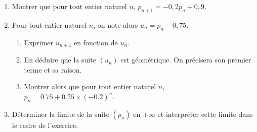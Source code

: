 \documentclass[11pt,fleqn, openany]{book} %
\begin{document}
\begin{exercise}
\begin{center}
\end{center}
  \begin{enumerate}  
    \item Montrer que pour tout entier naturel $n$, $p_{n+1}=-0,2p_n+0,9$.
    \item Pour tout entier naturel $n$, on note alors $u_n=p_n-0,75$.
    \begin{enumerate}
        \item Exprimer $u_{n+1}$ en fonction de $u_n$.
        \item En déduire que la suite $(u_n)$ est géométrique. On précisera son premier terme et sa raison.
        \item Montrer alors que pour tout entier naturel $n$, $p_n=0.75+0.25\times(-0.2)^n$.
    \end{enumerate}
    \item Déterminer la limite de la suite $(p_n)$ en $+\infty$ et interpréter cette limite dans le cadre de l'exercice.
\end{enumerate}
\end{exercise}
\end{document}

